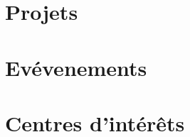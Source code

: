 \begin{sloppypar}
\begin{paracol}{2}



\section{Projets}




\section{Ev\'evenements}




\section{Centres d'int\'er\^ets}




\end{paracol}
\end{sloppypar}

